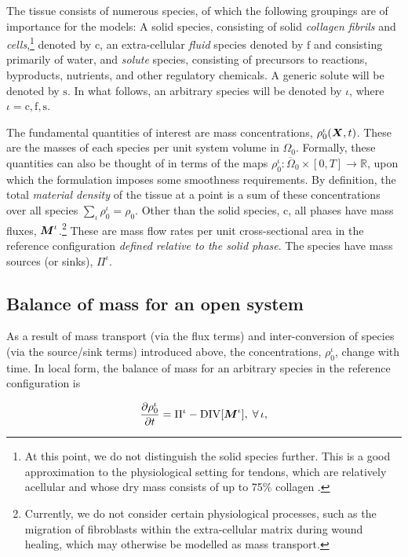 The tissue consists of numerous species, of which the following
 groupings are of importance for the models: A solid species,
 consisting of solid \emph{collagen fibrils} and \emph{cells},\footnote{At this
 point, we do not distinguish the solid species further. This is a
 good approximation to the physiological setting for tendons, which
 are relatively acellular and whose dry mass consists of up to 75\%
 collagen \citep{Nordinetal:2001}.} denoted by $\mathrm{c}$, an
 extra-cellular \emph{fluid} species denoted by $\mathrm{f}$ and
 consisting primarily of water, and \emph{solute} species, consisting
 of precursors to reactions, byproducts, nutrients, and other
 regulatory chemicals. A generic solute will be denoted by
 $\mathrm{s}$. In what follows, an arbitrary species will be denoted
 by $\iota$, where $\iota = \mathrm{c,f,s}$.

The fundamental quantities of interest are mass concentrations,
$\rho_0^\iota(\mbox{\boldmath$ X$},t)$. These are the masses of each species per unit
system volume in $\Omega_0$. Formally, these quantities can also be
thought of in terms of the maps $\rho_0^\iota: \overline{\Omega}_0
\times [0,T] \rightarrow \mathbb{R}$, upon which the formulation
imposes some smoothness requirements. By definition, the total {\em
material density} of the tissue at a point is a sum of these
concentrations over all species $\sum\limits_{\iota}\rho_0^\iota =
\rho_0$. Other than the solid species, $\mathrm{c}$, all phases have
mass fluxes, $\mbox{\boldmath$ M$}^\iota$.\footnote{Currently, we do not consider
  certain physiological 
processes, such as the migration of fibroblasts within the
extra-cellular matrix during wound healing, which may otherwise be
modelled as mass transport.} These are mass flow rates per unit
cross-sectional area in the reference configuration \emph{defined
relative to the solid phase}. The species have mass sources (or
sinks), $\Pi^\iota$.

\subsection{Balance of mass for an open system}
\label{bomass} As a result of mass transport (via the flux terms) and
inter-conversion of species (via the source/sink terms) introduced
above, the concentrations, $\rho_0^\iota$, change with time. In
local form, the balance of mass for an arbitrary species in the
reference configuration is

\begin{equation}
\frac{\partial\rho_0^\iota}{\partial t} = \Pi^\iota -
\mathrm{\small{DIV}}[\mbox{\boldmath$ M$}^\iota],\;\forall\,\iota,
\label{massbalance1}
\end{equation}

